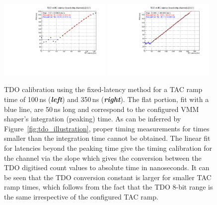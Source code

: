 \begin{figure}[!htb]
    \begin{center}
        \includegraphics[width=0.48\textwidth]{figures/nsw/calibration/timing_calib_bcLatency_TAC100}
        \includegraphics[width=0.48\textwidth]{figures/nsw/calibration/timing_calib_bcLatency_TAC350}
        \caption{
            TDO calibration using the fixed-latency method for a TAC ramp time of 100\,ns (\textbf{\textit{left}})
            and 350\,ns (\textbf{\textit{right}}).
            The flat portion, fit with a blue line, are 50\,ns long and correspond to the configured
            VMM shaper's integration (peaking) time.
            As can be inferred by Figure~\ref{fig:tdo_illustration}, proper timing measurements for times
            smaller than the integration time cannot be obtained.
            The linear fit for latencies beyond the peaking time give the timing calibration for the channel via
            the slope which gives the conversion between the TDO digitised count values to absolute
            time in nanoseconds.
            It can be seen that the TDO conversion constant is larger for smaller TAC ramp times,
            which follows from the fact that the TDO 8-bit range is the same irrespective of the configured
            TAC ramp.
        }
        \label{fig:timing_calib_bcLatency}
    \end{center}
\end{figure}

